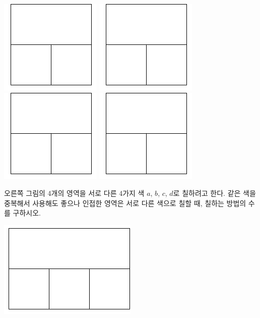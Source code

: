 \documentclass[a4paper]{oblivoir}
\begin{document}
\includegraphics[width=.1\textwidth]{4}\quad
\includegraphics[width=.1\textwidth]{4}\quad
\includegraphics[width=.1\textwidth]{4}\quad
\includegraphics[width=.1\textwidth]{4}\\[5pt]



\newpage
%
\begin{minipage}{.65\textwidth}
\begin{Exercise}
오른쪽 그림의 4개의 영역을 서로 다른 4가지 색 \(a\), \(b\), \(c\), \(d\)로 칠하려고 한다.
같은 색을 중복해서 사용해도 좋으나 인접한 영역은 서로 다른 색으로 칠할 때, 칠하는 방법의 수를 구하시오.
\end{Exercise}
\end{minipage}
\quad
\begin{minipage}{.25\textwidth}
\includegraphics[width=.5\textwidth]{5}
\end{minipage}
\end{document}
